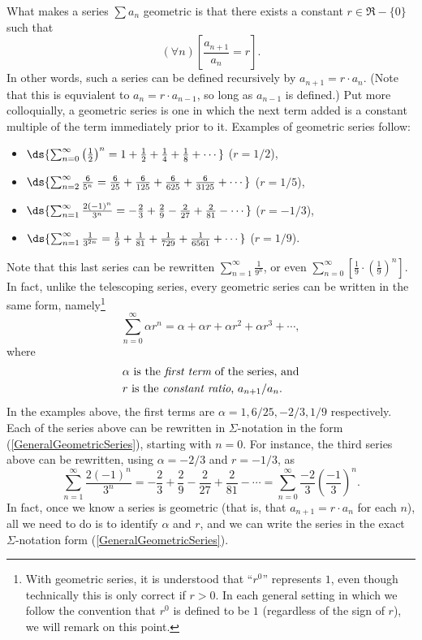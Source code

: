 What makes a series $\sum a_n$ geometric is that there exists a constant 
$r\in\Re-\{0\}$ such that
\begin{equation}
(\forall n)\left[\frac{a_{n+1}}{a_n}=r\right].\label{RForGeometricSeries}
\end{equation}
In other words, such a series can be defined recursively
by $a_{n+1}=r\cdot a_n$.  (Note that this is equvialent to 
$a_n=r\cdot a_{n-1}$, so long as $a_{n-1}$ is defined.)
Put more colloquially, a geometric series is one in which
the next term added is a constant multiple of the
term immediately prior to it.  Examples of geometric series follow:
\begin{itemize}
\item $\ds{\sum_{n=0}^\infty\left(\frac12\right)^n
   =1+\frac12+\frac14+\frac18+\cdots}$ \qquad($r=1/2$),
\item $\ds{\sum_{n=2}^\infty \frac6{5^n}=\frac6{25}
          +\frac6{125}+\frac6{625}+\frac6{3125}+
       \cdots}$ \qquad($r=1/5$),
\item $\ds{\sum_{n=1}^\infty\frac{2(-1)^n}{3^n}
   =-\frac23+\frac29-\frac2{27}+\frac2{81}-\cdots}$\qquad
     ($r=-1/3$),
\item $\ds{\sum_{n=1}^\infty\frac1{3^{2n}}
   =\frac19+\frac1{81}+\frac1{729}+\frac1{6561}+\cdots}$
   \qquad($r=1/9$).
\end{itemize}
Note that this last series can be 
rewritten $\sum_{n=1}^\infty\frac1{9^n}$,
or even $\sum_{n=0}^\infty\left[\frac19\cdot\left(\frac19\right)^n\right]$.
In fact, unlike the
telescoping series, every geometric series can be written in the 
same form, namely\footnote{%
With geometric series, it is understood that ``$r^0$'' represents
$1$, even though technically this is only correct if $r>0$.
In each general setting in which we follow the convention
that $r^0$ is defined to be $1$ (regardless of the sign of $r$), 
we will remark on this point.
}
\begin{equation}
\sum_{n=0}^\infty \alpha r^n
  =\alpha+\alpha r+\alpha r^2+\alpha r^3+\cdots,
\label{GeneralGeometricSeries}
\end{equation}
where
\begin{align}
&\alpha\text{ is the {\it first term} of the series, and}\\
&r\text{ is the {\it constant ratio}, } a_{n+1}/a_n.
\end{align}
In the examples above, the first terms
are $\alpha=1,6/25,-2/3,1/9$ respectively.
Each of the series above can be rewritten
in $\Sigma$-notation in the form (\ref{GeneralGeometricSeries}),
starting with $n=0$.
For instance, the third series above can be rewritten,
using $\alpha=-2/3$ and $r=-1/3$, as
$$
\sum_{n=1}^\infty\frac{2(-1)^n}{3^n}
   =-\frac23+\frac29-\frac2{27}+\frac2{81}-\cdots
   =\sum_{n=0}^\infty \frac{-2}3\left(\frac{-1}3\right)^n.
$$
In fact, once we know a series is geometric (that is,
that $a_{n+1}=r\cdot a_n$ for each $n$), all we need
to do is to identify $\alpha$ and $r$, and we can write
the series in the exact $\Sigma$-notation form 
(\ref{GeneralGeometricSeries}).

